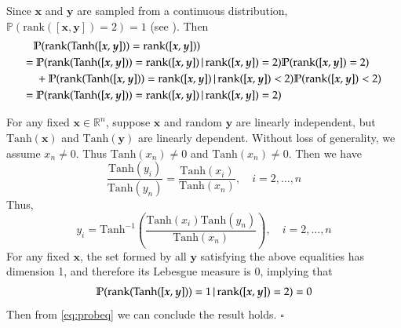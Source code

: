 \documentclass{article}
\newcommand\doubleP{\mathbb{P}}
\newcommand\red{\textcolor{red}}
\newenvironment{proof}{{\noindent\it Proof}\quad}{\hfill $\square$\par}
\begin{document}
\begin{appendices}
\begin{proof}
Since $\bm{x}$ and  $\bm{y}$ are sampled from a continuous distribution,
 $\doubleP(\mbox{rank}([\bm{x},\bm{y}])=2)=1$ (see \cite{feng2007rank}).
Then
\begin{align}
  & \doubleP(\text{rank}(\text{Tanh}([\bm{x},\bm{y}])) = \text{rank}([\bm{x},\bm{y}])) \notag\\
 = & \ \doubleP(\text{rank}(\text{Tanh}([\bm{x},\bm{y}])) = \text{rank}([\bm{x},\bm{y}])
  \,|\, \text{rank}([\bm{x},\bm{y}])=2) \doubleP(\text{rank}([\bm{x},\bm{y}])=2) \notag\\
  & \ + \doubleP(\text{rank}(\text{Tanh}([\bm{x},\bm{y}])) = \text{rank}([\bm{x},\bm{y}])
  \,|\,\text{rank}([\bm{x},\bm{y}])<2) \doubleP(\text{rank}([\bm{x},\bm{y}])<2) \notag\\
 = & \ \doubleP(\text{rank}(\text{Tanh}([\bm{x},\bm{y}])) = \text{rank}([\bm{x},\bm{y}])
  \,|\, \text{rank}([\bm{x},\bm{y}])=2) \label{eq:probeq}
  \end{align}

%


For any fixed $\bm{x}\in \mathbb{R}^n$,
suppose $\bm{x}$ and random $\bm{y}$ are linearly independent, but $\text{Tanh}(\bm{x})$ and $\text{Tanh}(\bm{y})$ are linearly dependent.
Without loss of generality, we assume $x_n \neq 0$.
Thus $\text{Tanh}(x_n)\neq 0$ and $\text{Tanh}(x_n)\neq 0$.
Then we have
$$
\frac{\text{Tanh}(y_i)}{\text{Tanh}(y_n)} = \frac{\text{Tanh}(x_i)}{\text{Tanh}(x_n)}, \quad
i=2,\ldots, n
$$
Thus,
$$
y_i = \text{Tanh}^{-1} \left(\frac{\text{Tanh} (x_i) \text{Tanh} (y_n)}{\text{Tanh}(x_n) }\right)
, \quad i=2,\ldots, n
$$
For any fixed $\bm{x}$, the set formed by all $\bm{y}$ satisfying the above equalities
has dimension 1,
and therefore its Lebesgue measure is 0, implying that
$$\doubleP(\rank(\mathrm{Tanh}([\bm{x},\bm{y}]))=1
\,|\, \text{rank}([\bm{x},\bm{y}])=2)=0
$$
Then from \eqref{eq:probeq} we can conclude the result holds.
\end{proof}


\end{appendices}
\end{document}
